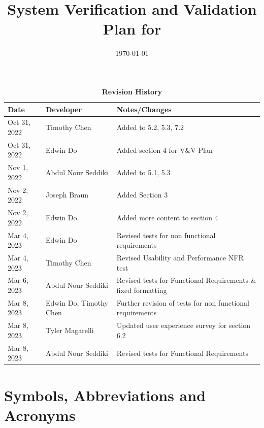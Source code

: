 \documentclass[12pt, titlepage]{article}
\begin{document}
\title{System Verification and Validation Plan for \progname{}} 
\author{\authname}
\date{\today}
	
\maketitle


\begin{table}[H]
  \caption{\bf Revision History}
  \begin{tabularx}{\textwidth}{p{2.5cm}p{2.5cm}X}
  \toprule {\bf Date} & {\bf Developer} & {\bf Notes/Changes}\\
  \midrule
  Oct 31, 2022 & Timothy Chen & Added to 5.2, 5.3, 7.2\\
  Oct 31, 2022 & Edwin Do & Added section 4 for V\&V Plan\\
  Nov 1, 2022 & Abdul Nour Seddiki & Added to 5.1, 5.3\\
  Nov 2, 2022 & Joseph Braun & Added Section 3\\
  Nov 2, 2022 & Edwin Do & Added more content to section 4 \\
  Mar 4, 2023 & Edwin Do & Revised tests for non functional requirements\\
  Mar 4, 2023 & Timothy Chen & Revised Usability and Performance NFR test\\
  Mar 6, 2023 & Abdul Nour Seddiki & Revised tests for Functional Requirements \& fixed formatting\\
  Mar 8, 2023 & Edwin Do, Timothy Chen & Further revision of tests for non functional requirements\\
  Mar 8, 2023 & Tyler Magarelli & Updated user experience survey for section 6.2\\
  Mar 8, 2023 & Abdul Nour Seddiki & Revised tests for Functional Requirements\\
  \bottomrule
  \end{tabularx}
  \end{table}
  

\newpage

\tableofcontents

\listoftables


\newpage

\section{Symbols, Abbreviations and Acronyms}
\end{document}
